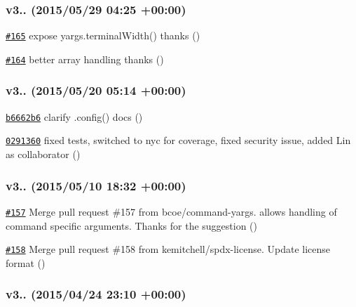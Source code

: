 \subsubsection*{v3.. (2015/05/29 04\+:25 +00\+:00)}


\begin{DoxyItemize}
\item \href{https://github.com/bcoe/yargs/pull/165}{\tt \#165} expose yargs.\+terminal\+Width() thanks  ()
\item \href{https://github.com/bcoe/yargs/pull/164}{\tt \#164} better array handling thanks  ()
\end{DoxyItemize}

\subsubsection*{v3.. (2015/05/20 05\+:14 +00\+:00)}


\begin{DoxyItemize}
\item \href{https://github.com/bcoe/yargs/commit/b6662b6774cfeab4876f41ec5e2f67b7698f4e2f}{\tt b6662b6} clarify .config() docs ()
\item \href{https://github.com/bcoe/yargs/commit/02913606285ce31ce81d7f12c48d8a3029776ec7}{\tt 0291360} fixed tests, switched to nyc for coverage, fixed security issue, added Lin as collaborator ()
\end{DoxyItemize}

\subsubsection*{v3.. (2015/05/10 18\+:32 +00\+:00)}


\begin{DoxyItemize}
\item \href{https://github.com/bcoe/yargs/pull/157}{\tt \#157} Merge pull request \#157 from bcoe/command-\/yargs. allows handling of command specific arguments. Thanks for the suggestion  ()
\item \href{https://github.com/bcoe/yargs/pull/158}{\tt \#158} Merge pull request \#158 from kemitchell/spdx-\/license. Update license format ()
\end{DoxyItemize}

\subsubsection*{v3.. (2015/04/24 23\+:10 +00\+:00)}


